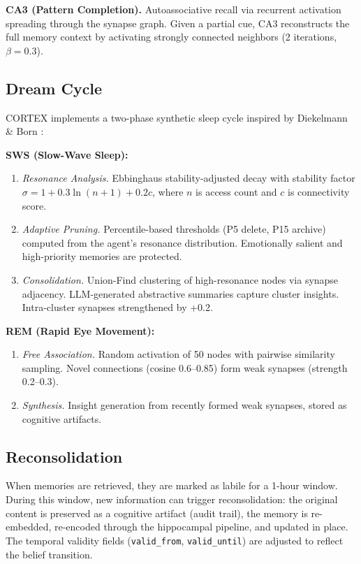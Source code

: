 \documentclass{article}
\begin{document}
\textbf{CA3 (Pattern Completion).} Autoassociative recall via recurrent activation spreading through the synapse graph. Given a partial cue, CA3 reconstructs the full memory context by activating strongly connected neighbors (2 iterations, $\beta = 0.3$).

\subsection{Dream Cycle}

CORTEX implements a two-phase synthetic sleep cycle inspired by Diekelmann \& Born \citep{diekelmann2010memory}:

\textbf{SWS (Slow-Wave Sleep):}
\begin{enumerate}[nosep]
  \item \emph{Resonance Analysis.} Ebbinghaus stability-adjusted decay with stability factor $\sigma = 1 + 0.3\ln(n+1) + 0.2c$, where $n$ is access count and $c$ is connectivity score.
  \item \emph{Adaptive Pruning.} Percentile-based thresholds (P5 delete, P15 archive) computed from the agent's resonance distribution. Emotionally salient and high-priority memories are protected.
  \item \emph{Consolidation.} Union-Find clustering of high-resonance nodes via synapse adjacency. LLM-generated abstractive summaries capture cluster insights. Intra-cluster synapses strengthened by +0.2.
\end{enumerate}

\textbf{REM (Rapid Eye Movement):}
\begin{enumerate}[nosep,start=4]
  \item \emph{Free Association.} Random activation of 50 nodes with pairwise similarity sampling. Novel connections (cosine 0.6--0.85) form weak synapses (strength 0.2--0.3).
  \item \emph{Synthesis.} Insight generation from recently formed weak synapses, stored as cognitive artifacts.
\end{enumerate}

\subsection{Reconsolidation}

When memories are retrieved, they are marked as labile for a 1-hour window. During this window, new information can trigger reconsolidation: the original content is preserved as a cognitive artifact (audit trail), the memory is re-embedded, re-encoded through the hippocampal pipeline, and updated in place. The temporal validity fields (\texttt{valid\_from}, \texttt{valid\_until}) are adjusted to reflect the belief transition.
\end{document}
